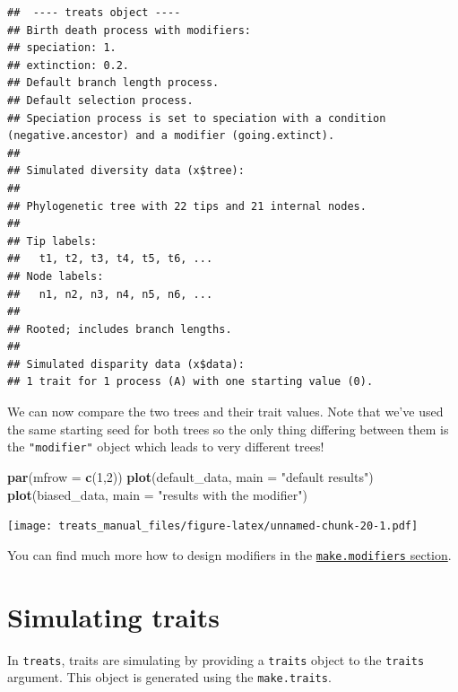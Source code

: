 \documentclass[
]{book}
\newenvironment{Shaded}{\begin{snugshade}}{\end{snugshade}}
\newcommand{\DataTypeTok}[1]{\textcolor[rgb]{0.13,0.29,0.53}{#1}}
\newcommand{\DecValTok}[1]{\textcolor[rgb]{0.00,0.00,0.81}{#1}}
\newcommand{\KeywordTok}[1]{\textcolor[rgb]{0.13,0.29,0.53}{\textbf{#1}}}
\newcommand{\NormalTok}[1]{#1}
\newcommand{\StringTok}[1]{\textcolor[rgb]{0.31,0.60,0.02}{#1}}
\begin{document}
\begin{verbatim}
##  ---- treats object ---- 
## Birth death process with modifiers:
## speciation: 1.
## extinction: 0.2.
## Default branch length process.
## Default selection process.
## Speciation process is set to speciation with a condition (negative.ancestor) and a modifier (going.extinct).
## 
## Simulated diversity data (x$tree):
## 
## Phylogenetic tree with 22 tips and 21 internal nodes.
## 
## Tip labels:
##   t1, t2, t3, t4, t5, t6, ...
## Node labels:
##   n1, n2, n3, n4, n5, n6, ...
## 
## Rooted; includes branch lengths.
## 
## Simulated disparity data (x$data):
## 1 trait for 1 process (A) with one starting value (0).
\end{verbatim}

We can now compare the two trees and their trait values.
Note that we've used the same starting seed for both trees so the only thing differing between them is the \texttt{"modifier"} object which leads to very different trees!

\begin{Shaded}
\begin{Highlighting}[]
\KeywordTok{par}\NormalTok{(}\DataTypeTok{mfrow =} \KeywordTok{c}\NormalTok{(}\DecValTok{1}\NormalTok{,}\DecValTok{2}\NormalTok{))}
\KeywordTok{plot}\NormalTok{(default\_data, }\DataTypeTok{main =} \StringTok{"default results"}\NormalTok{)}
\KeywordTok{plot}\NormalTok{(biased\_data, }\DataTypeTok{main =} \StringTok{"results with the modifier"}\NormalTok{)}
\end{Highlighting}
\end{Shaded}

\texttt{[image: treats\_manual\_files/figure-latex/unnamed-chunk-20-1.pdf]}

You can find much more how to design modifiers in the \protect\hyperlink{makemodifiers}{\texttt{make.modifiers} section}.

\hypertarget{maketraits}{%
\chapter{Simulating traits}\label{maketraits}}

In \texttt{treats}, traits are simulating by providing a \texttt{traits} object to the \texttt{traits} argument.
This object is generated using the \texttt{make.traits}.
\end{document}
